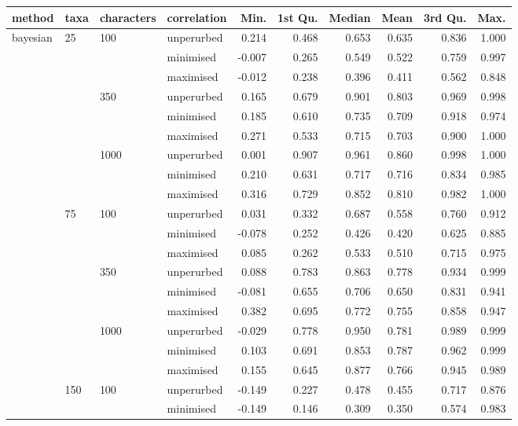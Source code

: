 \begin{longtable}{llllrrrrrr}
  \hline
method & taxa & characters & correlation & Min. & 1st Qu. & Median & Mean & 3rd Qu. & Max. \\ 
  \hline
bayesian & 25 & 100 & unperurbed & 0.214 & 0.468 & 0.653 & 0.635 & 0.836 & 1.000 \\ 
   &  &  & minimised & -0.007 & 0.265 & 0.549 & 0.522 & 0.759 & 0.997 \\ 
   &  &  & maximised & -0.012 & 0.238 & 0.396 & 0.411 & 0.562 & 0.848 \\ 
   &  & 350 & unperurbed & 0.165 & 0.679 & 0.901 & 0.803 & 0.969 & 0.998 \\ 
   &  &  & minimised & 0.185 & 0.610 & 0.735 & 0.709 & 0.918 & 0.974 \\ 
   &  &  & maximised & 0.271 & 0.533 & 0.715 & 0.703 & 0.900 & 1.000 \\ 
   &  & 1000 & unperurbed & 0.001 & 0.907 & 0.961 & 0.860 & 0.998 & 1.000 \\ 
   &  &  & minimised & 0.210 & 0.631 & 0.717 & 0.716 & 0.834 & 0.985 \\ 
   &  &  & maximised & 0.316 & 0.729 & 0.852 & 0.810 & 0.982 & 1.000 \\ 
   & 75 & 100 & unperurbed & 0.031 & 0.332 & 0.687 & 0.558 & 0.760 & 0.912 \\ 
   &  &  & minimised & -0.078 & 0.252 & 0.426 & 0.420 & 0.625 & 0.885 \\ 
   &  &  & maximised & 0.085 & 0.262 & 0.533 & 0.510 & 0.715 & 0.975 \\ 
   &  & 350 & unperurbed & 0.088 & 0.783 & 0.863 & 0.778 & 0.934 & 0.999 \\ 
   &  &  & minimised & -0.081 & 0.655 & 0.706 & 0.650 & 0.831 & 0.941 \\ 
   &  &  & maximised & 0.382 & 0.695 & 0.772 & 0.755 & 0.858 & 0.947 \\ 
   &  & 1000 & unperurbed & -0.029 & 0.778 & 0.950 & 0.781 & 0.989 & 0.999 \\ 
   &  &  & minimised & 0.103 & 0.691 & 0.853 & 0.787 & 0.962 & 0.999 \\ 
   &  &  & maximised & 0.155 & 0.645 & 0.877 & 0.766 & 0.945 & 0.989 \\ 
   & 150 & 100 & unperurbed & -0.149 & 0.227 & 0.478 & 0.455 & 0.717 & 0.876 \\ 
   &  &  & minimised & -0.149 & 0.146 & 0.309 & 0.350 & 0.574 & 0.983 \\ 

\end{longtable}
